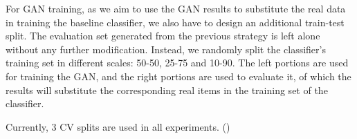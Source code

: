 For GAN training, as we aim to use the GAN results to substitute the real data in training
the baseline classifier, we also have to design an additional train-test split. The
evaluation set generated from the previous strategy is left alone without any further
modification. Instead, we randomly split the classifier's training set in different
scales: 50-50, 25-75 and 10-90. The left portions are used for training the GAN, and the right
portions are used to evaluate it, of which the results will substitute the corresponding
real items in the training set of the classifier.

Currently, 3 CV splits are used in all experiments. ()
